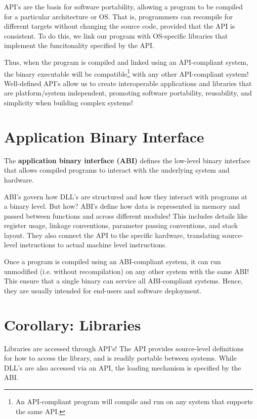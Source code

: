\documentclass{report}
\begin{document}
API's are the basis for software portability, allowing a program to be compiled for a particular
architecture or OS. That is, programmers can recompile for different targets without changing the source
code, provided that the API is consistent. To do this, we link our program with OS-specific
libraries that implement the funcitonality specified by the API.

Thus, when the program is compiled and linked using an API-compliant system, the binary executable
will be compatible\footnote{An API-compliant program will compile and run on any system that
  supports the same API.} with any other API-compliant system! Well-defined API's allow us to create
interoperable applications and libraries that are platform/system independent, promoting software
portability, reusability, and simplicity when building complex systems!





\section{Application Binary Interface}
\label{sec:ABIS}
\begin{tcolorbox}[title=Definition: Application Binary Interface]
  The \textbf{application binary interface (ABI)} defines the low-level binary interface that allows
  compiled programs to interact with the underlying system and hardware.
\end{tcolorbox}

ABI's govern how DLL's are structured and how they interact with programs at a binary level. But
how? ABI's define how data is represented in memory and passed between functions and across
different modules! This includes details like register usage, linkage conventions, parameter passing
conventions, and stack layout. They also connect the API to the specific hardware, translating
source-level instructions to actual machine level instructions.

Once a program is compiled using an ABI-compliant system, it can run unmodified (i.e. without
recompilation) on any other system with the same ABI! This ensure that a single binary can service 
all ABI-compliant systems. Hence, they are usually intended for end-users and software deployment.





\section{Corollary: Libraries}
Libraries are accessed through API's! The API provides source-level definitions for how to access
the library, and is readily portable between systems. While DLL's are also accessed via an API, the
loading mechanism is specified by the ABI.
\end{document}
